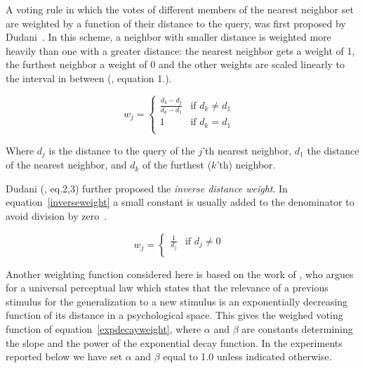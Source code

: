 \documentclass{report}
\begin{document}
A voting rule in which the votes of different members of the nearest
neighbor set are weighted by a function of their distance to the
query, was first proposed by Dudani~. In this scheme, a
neighbor with smaller distance is weighted more heavily than one with
a greater distance: the nearest neighbor gets a weight of 1, the
furthest neighbor a weight of 0 and the other weights are scaled
linearly to the interval in between (, equation 1.).

\begin{equation}
\label{dudani_eq}
w_{j}= \left \{ \begin{array}{ll}  
                        \frac{d_{k} - d_{j}}{d_{k} - d_{1}} & \mbox{if $d_{k}
\not= d_{1}$ } \\ 
                        1 & \mbox{if $d_{k} = d_{1}$}\\
                    \end{array} 
          \right. 
\end{equation}

Where $d_{j}$ is the distance to the query of the $j$'th nearest
neighbor, $d_{1}$ the distance of the nearest neighbor, and $d_{k}$ of
the furthest ($k$'th) neighbor.

Dudani (, eq.2,3) further proposed the {\em inverse
distance weight}. In equation~\ref{inverseweight} a small constant is
usually added to the denominator to avoid division by
zero~\cite{Wettschereck94}.

\begin{equation}
\label{inverseweight}
w_{j}= \left \{ \begin{array}{ll}  
                        \frac{1}{d_{j}} & \mbox{if $d_{j} \not= 0$ } \\ 
                    \end{array} 
          \right. 
\end{equation}

Another weighting function considered here is based on the work of
, who argues for a universal perceptual law
which states that the relevance of a previous stimulus for the
generalization to a new stimulus is an exponentially decreasing
function of its distance in a psychological space. This gives the
weighed voting function of equation~\ref{expdecayweight}, where
$\alpha$ and $\beta$ are constants determining the slope and the power
of the exponential decay function. In the experiments reported below
we have set $\alpha$ and $\beta$ equal to 1.0 unless indicated
otherwise.
\end{document}
